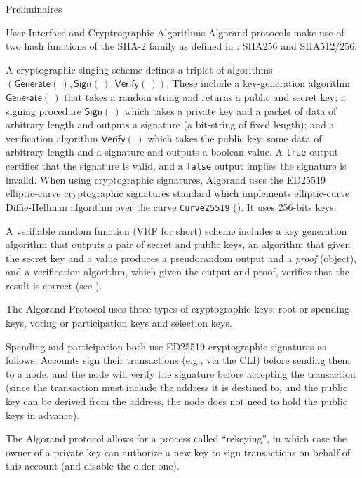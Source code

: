 \documentclass[10pt,a4paper]{article}
\begin{document}
\begin{section}{Preliminaires}
\begin{subsection}{User Interface and Cryptrographic Algorithms}
    Algorand protocols make use of two hash functions of the SHA-2 family
    as defined in \cite{NIST.FIPS.180-4}: SHA256 and SHA512/256.
    
    A cryptographic singing scheme defines a triplet of algorithms $(\mathsf{Generate}(\,),\mathsf{Sign}(\,),\mathsf{Verify}(\,))$. 
    These include a key-generation algorithm $\mathsf{Generate}(\,)$ that takes a random string and
    returns a public and secret key; a signing procedure $\mathsf{Sign}(\,)$ which takes a private key 
    and a packet of data of arbitrary length and outputs a signature (a bit-string of fixed length); and
    a verification algorithm $\mathsf{Verify}(\,)$ which takes the public key, some data of arbitrary 
    length and a signature and outputs a boolean value.
    A {\tt true} output certifies that the signature is valid, and a {\tt false} output implies the 
    signature is invalid.
    When using cryptographic signatures, Algorand uses the ED25519 elliptic-curve cryptographic 
    signatures standard which implements elliptic-curve Diffie-Hellman algorithm over the curve 
    {\tt Curve25519} (\cite{Bernstein:2006}). It uses 256-bits keys. 

    A verifiable random function (VRF for short) scheme includes a key generation algorithm
    that outputs a pair of secret and public keys, an algorithm that given the secret key and 
    a value produces a pseudorandom output and a {\em proof} (object), and 
    a verification algorithm, which given the output and proof, verifies that the result is correct (see 
    \cite{MicaliRabinVadhan:1999}).

    The Algorand Protocol uses three types of cryptographic keys: 
    root or spending keys,
    voting or participation keys and
    selection keys.

    Spending and participation both use ED25519 cryptographic signatures as follows. 
    Accounts sign their transactions (e.g., via the CLI) before sending them to a node, and 
    the node will verify the signature before accepting the transaction (since the transaction
    must include the address it is destined to, and the public key can be derived from the
    address, the node does not need to hold the public keys in advance). 

    The Algorand protocol allows for a process called ``rekeying'', in which case 
    the owner of a private key can authorize a new key to sign transactions on behalf 
    of this account (and disable the older one).


\end{subsection}
\end{section}
\end{document}

